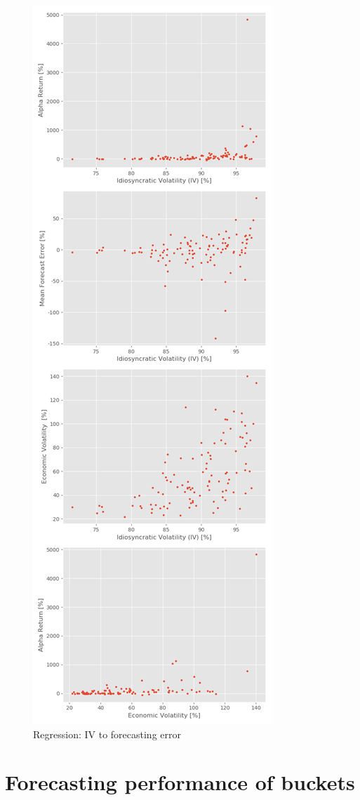 \begin{figure}[h]
    \centering
    \includegraphics[height = 9 in , width = 5 in]{Plot/IndividualStockRegression.png}
    \caption{Regression: IV to forecasting error}
    \label{visualization}
\end{figure}

\section*{Forecasting performance of buckets }

